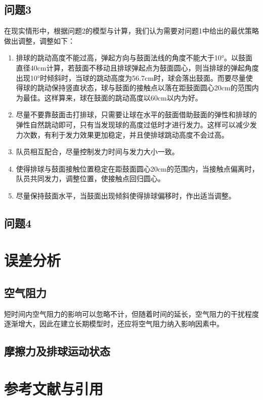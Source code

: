 \documentclass{cumcmthesis}
\begin{document}
\subsection{问题3}

在现实情形中，根据问题2的模型与计算，我们认为需要对问题1中给出的最优策略做出调整，调整如下：
\begin{enumerate}
\item 排球的跳动高度不能过高，弹起方向与鼓面法线的角度不能大于10°。以鼓面直径40cm计算，若鼓面不移动且排球弹起点为鼓面圆心，则当排球的弹起角度出现10°时倾斜时，当球的跳动高度为56.7cm时，球会落出鼓面。而要尽量使得球的跳动保持竖直状态，球与鼓面的接触点以落在距鼓面圆心20cm的范围内为最佳。这样算来，球在鼓面的跳动高度以60cm以内为好。
\item 尽量不要靠鼓面击打排球，只需要让球在水平的鼓面借助鼓面的弹性和排球的弹性自然跳动即可，只有当发现球的高度过低时才进行发力。这样可以减少发力次数，有利于发力效果更加稳定，并且使排球跳动高度不会过高。
\item 队员相互配合，尽量控制发力时间与发力大小一致。
\item 使得排球与鼓面接触位置稳定在距鼓面圆心20cm的范围内，当接触点偏离时，队员共同发力，调整位置，使接触点回归圆心。
\item 尽量保持鼓面水平，当鼓面出现倾斜使得排球偏移时，作出适当调整。
\end{enumerate}

\subsection{问题4}

\section{误差分析}

\subsection{空气阻力}
短时间内空气阻力的影响可以忽略不计，但随着时间的延长，空气阻力的干扰程度逐渐增大，因此在建立长期模型时，还应将空气阻力纳入影响因素中。

\subsection{摩擦力及排球运动状态}

\section{参考文献与引用}
\end{document}
